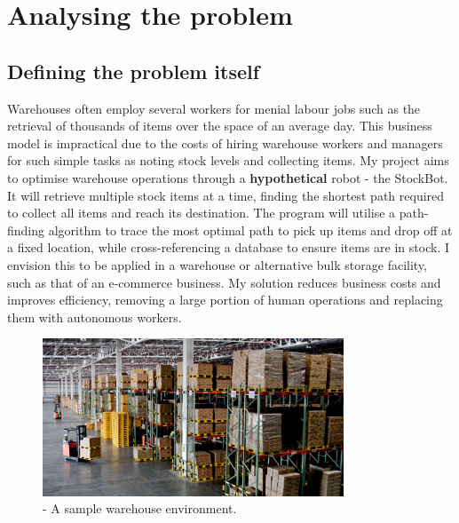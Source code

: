 
\chapter{Analysing the problem}  %

\ifpdf
    \graphicspath{{Chapter1/Figs/Raster/}{Chapter1/Figs/PDF/}{Chapter1/Figs/}}
\else
    \graphicspath{{Chapter1/Figs/Vector/}{Chapter1/Figs/}}
\fi



\section{Defining the problem itself} %

Warehouses often employ several workers for menial labour jobs such as the retrieval of thousands of items over the space of an average day. This business model is impractical due to the costs of hiring warehouse workers and managers for such simple tasks as noting stock levels and collecting items. My project aims to optimise warehouse operations through a \textbf{hypothetical} robot - the StockBot. It will retrieve multiple stock items at a time, finding the shortest path required to collect all items and reach its destination. The program will utilise a path-finding algorithm to trace the most optimal path to pick up items and drop off at a fixed location, while cross-referencing a database to ensure items are in stock. I envision this to be applied in a warehouse or alternative bulk storage facility, such as that of an e-commerce business. My solution reduces business costs and improves efficiency, removing a large portion of human operations and replacing them with autonomous workers.

\begin{figure}[h!] 
\centering    
\includegraphics[width=0.8\textwidth]{Images/warehouse.jpg}
\caption{- A sample warehouse environment. \cite{warehouse}}
\end{figure}


